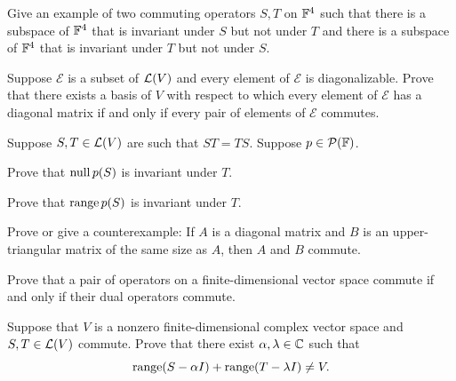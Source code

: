 \begin{exc}

\begin{exercise}
Give an example of two commuting operators $S,T$ on $\mathbb{F}^4$ such that there is a
subspace of $\mathbb{F}^4$ that is invariant under $S$ but not under $T$ and there is a
subspace of $\mathbb{F}^4$ that is invariant under $T$ but not under $S$.
\end{exercise}

\begin{exercise}
Suppose $\mathcal{E}$ is a subset of $\mathcal{L}(V)$ and every element of
$\mathcal{E}$ is diagonalizable. Prove that there exists a basis of $V$ with
respect to which every element of $\mathcal{E}$ has a diagonal matrix if and
only if every pair of elements of $\mathcal{E}$ commutes.

\end{exercise}

\begin{exercise}
Suppose $S,T\in\mathcal{L}(V)$ are such that $ST=TS$. Suppose $p\in\mathcal{P}(\mathbb{F})$.
\begin{parts}
\item Prove that $\operatorname{null} p(S)$ is invariant under $T$.
\item Prove that $\operatorname{range} p(S)$ is invariant under $T$.
\end{parts}
\end{exercise}

\begin{exercise}
Prove or give a counterexample: If $A$ is a diagonal matrix and $B$ is an
upper-triangular matrix of the same size as $A$, then $A$ and $B$ commute.
\end{exercise}

\begin{exercise}
Prove that a pair of operators on a finite-dimensional vector space commute if
and only if their dual operators commute.

\end{exercise}

\begin{exercise}
Suppose that $V$ is a nonzero finite-dimensional complex vector space and
$S,T\in\mathcal{L}(V)$ commute. Prove that there exist $\alpha,\lambda\in\mathbb{C}$ such that
\[ \operatorname{range}(S-\alpha I)+\operatorname{range}(T-\lambda I)\ne V. \]
\end{exercise}


\end{exc}
